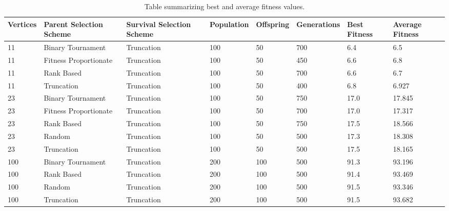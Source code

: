 \documentclass[conference,compsoc]{IEEEtran}
\begin{document}
\clearpage
\begin{table}[]
\begin{center}
\begin{tabular}{|l|l|l|l|l|l|l|l|}
\hline
Vertices & Parent Selection Scheme & Survival Selection Scheme & Population & Offspring & Generations & Best Fitness & Average Fitness \\ \hline
11       & Binary Tournament       & Truncation                & 100        & 50        & 700         & 6.4          & 6.5             \\ \hline
11       & Fitness Proportionate   & Truncation                & 100        & 50        & 450         & 6.6          & 6.8             \\ \hline
11       & Rank Based              & Truncation                & 100        & 50        & 700         & 6.6          & 6.7             \\ \hline
11       & Truncation              & Truncation                & 100        & 50        & 400         & 6.8          & 6.927           \\ \hline
23       & Binary Tournament       & Truncation                & 100        & 50        & 750         & 17.0         & 17.845          \\ \hline
23       & Fitness Proportionate   & Truncation                & 100        & 50        & 700         & 17.0         & 17.317          \\ \hline
23       & Rank Based              & Truncation                & 100        & 50        & 750         & 17.5         & 18.566          \\ \hline
23       & Random                  & Truncation                & 100        & 50        & 500         & 17.3         & 18.308          \\ \hline
23       & Truncation              & Truncation                & 100        & 50        & 500         & 17.5         & 18.165          \\ \hline
100      & Binary Tournament       & Truncation                & 200        & 100       & 500         & 91.3         & 93.196          \\ \hline
100      & Rank Based              & Truncation                & 200        & 100       & 500         & 91.4         & 93.469          \\ \hline
100      & Random                  & Truncation                & 200        & 100       & 500         & 91.5         & 93.346          \\ \hline
100      & Truncation              & Truncation                & 200        & 100       & 500         & 91.5         & 93.682          \\ \hline
\end{tabular}
\end{center}
\caption{Table summarizing best and average fitness values.}
\label{table1}
\end{table}



\end{document}
